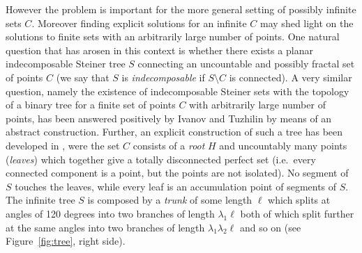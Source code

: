 \documentclass{amsart}
\theoremstyle{definition}
\theoremstyle{remark}
\begin{document}
However the problem is important for the more general setting of possibly infinite 
sets $C$. 
Moreover finding explicit solutions for an infinite $C$ may shed light on 
the solutions to finite sets with an arbitrarily large number of points.
One natural question that has arosen in this context is 
whether there exists a planar indecomposable Steiner tree $S$ connecting an uncountable 
and possibly fractal set of points $C$ 
(we say that $S$ is \emph{indecomposable} if $S\setminus C$ is 
connected).
A very similar question,
namely the existence of indecomposable Steiner sets with the topology 
of a binary tree for a finite set of points $C$ with arbitrarily 
large number of points, has been answered positively by Ivanov and 
Tuzhilin \cite{IvaTuz94} by means of an abstract construction.
Further, an explicit construction of such a tree has been developed
in \cite{PaoSteTep15}, were the set $C$ consists of a \emph{root} $H$ and uncountably many
points (\emph{leaves}) which together give a totally disconnected perfect set 
(i.e.\ every connected component is a point, but the points are not isolated).
No segment of $S$
touches the leaves, while every leaf is an accumulation point of
segments of $S$.
The infinite tree $S$ 
is composed by a \emph{trunk} of
some length $\ell$ which splits at angles of 120 degrees 
into two branches of length $\lambda_1 \ell$ 
both of which split further at the same angles into two branches of length
$\lambda_1\lambda_2\ell$ and so on (see Figure~\ref{fig:tree}, right side).
\end{document}
